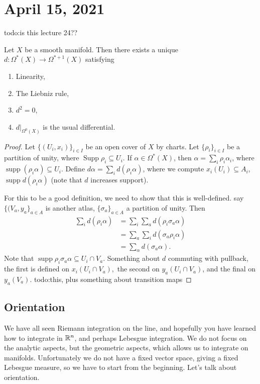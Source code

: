 \section{April 15, 2021} 
{\color{red}todo:is this lecture 24??} 
\begin{theorem}
    Let $X$ be a smooth manifold. Then there exists a unique $d \colon \Omega^*(X) \to \Omega^{*+1}(X)$ satisfying 
    \begin{enumerate}[label=(\roman*)]
    \setlength\itemsep{-.2em}
        \item Linearity,
        \item The Liebniz rule, 
        \item $d^2=0$,
        \item $d|_{\Omega^0(X)}$ is the usual differential.
    \end{enumerate}
\end{theorem}
\begin{proof}
    Let $\{(U_i ,x_i )\}_{i\in I}$ be an open cover of $X$ by charts. Let $\{\rho _i \} _{i \in I}$ be a partition of unity, where $\operatorname{Supp} \rho _i \subseteq U_i $. If $\alpha  \in \Omega^*(X)$, then $\alpha =\sum _i \rho_i \alpha _i $, where $\operatorname{supp}(\rho _i \alpha )\subseteq U_i $. Define $d\alpha =\sum _i  d(\rho _i \alpha )$, where we compute $x_i (U_i ) \subseteq A_i $, $\operatorname{supp}d(\rho_i \alpha )$ (note that $d$ increases support). 

    For this to be a good definition, we need to show that this is well-defined. say $\{(V_a,y_a\}_{a \in A} $ is another atlas, $\{\sigma _{a}\} _{a \in A}$ a partition of unity. Then 
    \begin{align*}
        \sum _i d(\rho _i \alpha )&=\sum _i \sum _a d(\rho _i \sigma _a\alpha )\\
                                  &=\sum_a\sum_i  d(\sigma_a\rho_i \alpha )\\
                                  &=\sum _{\alpha }d(\sigma_a\alpha ).
    \end{align*}
    Note that $\operatorname{supp}\rho _i \sigma _a \alpha \subseteq U_i \cap V_a$. Something about $d$ commuting with pullback, the first is defined on $x_i (U_i \cap V_a),$ the second on $ y_a(U_i \cap V_a)$, and the final on $y_a(V_a)$. {\color{red}todo:this, plus something about transition maps} 
\end{proof}

\subsection{Orientation}
We have all seen Riemann integration on the line, and hopefully you have learned how to integrate in $\mathbb{R}^n $, and perhaps Lebesgue integration. We do not focus on the analytic aspects, but the geometric aspects, which allows us to integrate on manifolds. Unfortunately we do not have a fixed vector space, giving a fixed Lebesgue measure, so we have to start from the beginning. Let's talk about orientation.

